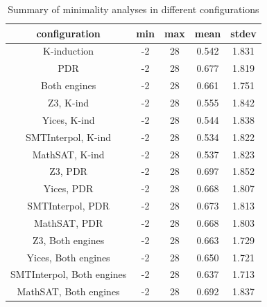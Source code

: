 %
%
%
%
%
%
%
%
\begin{table}
  \centering
  \begin{tabular}{|c|c|c|c|c|}
     \hline
     configuration & min & max & mean & stdev \\[0.5ex]
     \hline\hline
     K-induction & -2 & 28 & 0.542 & 1.831 \\[0.5ex]
     PDR & -2 & 28 & 0.677 & 1.819 \\[0.5ex]
     Both engines & -2 & 28 & 0.661 & 1.751 \\[0.5ex]
     \hline
     Z3, K-ind & -2 & 28 & 0.555 & 1.842 \\[0.5ex]
     Yices, K-ind & -2 & 28 & 0.544 & 1.838 \\[0.5ex]
     SMTInterpol, K-ind & -2 & 28 & 0.534 & 1.822 \\[0.5ex]
     MathSAT, K-ind & -2 & 28 & 0.537 & 1.823 \\[0.5ex]
     \hline
     Z3, PDR & -2 & 28 & 0.697 & 1.852 \\[0.5ex]
     Yices, PDR & -2 & 28 & 0.668 & 1.807 \\[0.5ex]
     SMTInterpol, PDR & -2 & 28 & 0.673 & 1.813 \\[0.5ex]
     MathSAT, PDR & -2 & 28 & 0.668 & 1.803 \\[0.5ex]
     \hline
     Z3, Both engines & -2 & 28 & 0.663 & 1.729 \\[0.5ex]
     Yices, Both engines & -2 & 28 & 0.650 & 1.721 \\[0.5ex]
     SMTInterpol, Both engines & -2 & 28 & 0.637 & 1.713 \\[0.5ex]
     MathSAT, Both engines & -2 & 28 & 0.692 & 1.837 \\[0.5ex]
     \hline
   \end{tabular}
  \caption{Summary of minimality analyses in different configurations}\label{tab:minimality}
\end{table}

